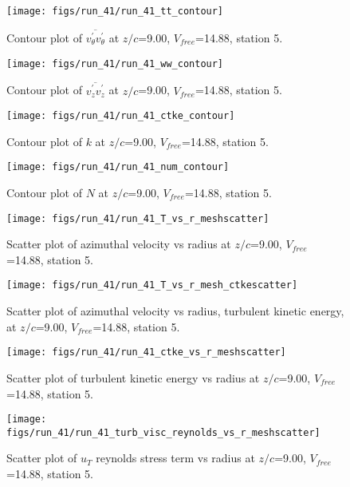 \begin{figure}[H]
\centering
\texttt{[image: figs/run\_41/run\_41\_tt\_contour]}
\caption{Contour plot of $\overline{v_{\theta}^{\prime} v_{\theta}^{\prime}}$ at $z/c$=9.00, $V_{free}$=14.88, station 5.}
\end{figure}


\begin{figure}[H]
\centering
\texttt{[image: figs/run\_41/run\_41\_ww\_contour]}
\caption{Contour plot of $\overline{v_{z}^{\prime} v_{z}^{\prime}}$ at $z/c$=9.00, $V_{free}$=14.88, station 5.}
\end{figure}


\begin{figure}[H]
\centering
\texttt{[image: figs/run\_41/run\_41\_ctke\_contour]}
\caption{Contour plot of $k$ at $z/c$=9.00, $V_{free}$=14.88, station 5.}
\end{figure}


\begin{figure}[H]
\centering
\texttt{[image: figs/run\_41/run\_41\_num\_contour]}
\caption{Contour plot of $N$ at $z/c$=9.00, $V_{free}$=14.88, station 5.}
\end{figure}


\begin{figure}[H]
\centering
\texttt{[image: figs/run\_41/run\_41\_T\_vs\_r\_meshscatter]}
\caption{Scatter plot of azimuthal velocity vs radius at $z/c$=9.00, $V_{free}$=14.88, station 5.}
\end{figure}


\begin{figure}[H]
\centering
\texttt{[image: figs/run\_41/run\_41\_T\_vs\_r\_mesh\_ctkescatter]}
\caption{Scatter plot of azimuthal velocity vs radius, turbulent kinetic energy, at $z/c$=9.00, $V_{free}$=14.88, station 5.}
\end{figure}


\begin{figure}[H]
\centering
\texttt{[image: figs/run\_41/run\_41\_ctke\_vs\_r\_meshscatter]}
\caption{Scatter plot of turbulent kinetic energy vs radius at $z/c$=9.00, $V_{free}$=14.88, station 5.}
\end{figure}


\begin{figure}[H]
\centering
\texttt{[image: figs/run\_41/run\_41\_turb\_visc\_reynolds\_vs\_r\_meshscatter]}
\caption{Scatter plot of $
u_T$ reynolds stress term vs radius at $z/c$=9.00, $V_{free}$=14.88, station 5.}
\end{figure}


